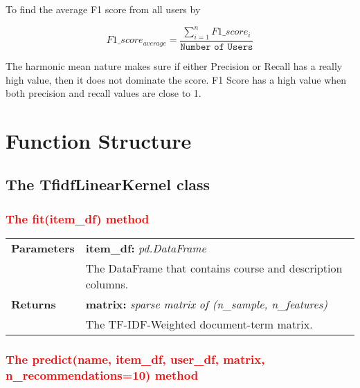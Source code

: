 \noindent To find the average F1 score from all users by

\begin{equation}
    \text{$F1\_score_{average}$} = \frac{\sum_{i=1}^{n}F1\_score_{i}}{\texttt{Number of Users}}
\end{equation}

\noindent The harmonic mean nature makes sure if either Precision or Recall has a really high value, then it does not dominate the score. F1 Score has a high value when both precision and recall values are close to 1.

\newpage
\section{Function Structure}

\subsection{The TfidfLinearKernel class}

\subsubsection{\textcolor{red}{The fit(item\_df) method}}

\vspace{-7mm}
\begin{table}[H]
\small
\begin{tabularx}{\textwidth}{|p{2cm}|X|}
\hline
\textbf{Parameters} & \textbf{item\_df:} \textit{pd.DataFrame} \\ & \hspace{5mm} The DataFrame that contains course and description columns. \\
\textbf{Returns} & \textbf{matrix:} \textit{sparse matrix of (n\_sample, n\_features)} \\ & \hspace{5mm} The TF-IDF-Weighted document-term matrix. \\
\hline
\end{tabularx}
\end{table}

\subsubsection{\textcolor{red}{The predict(name, item\_df, user\_df, matrix, n\_recommendations=10) method}}

